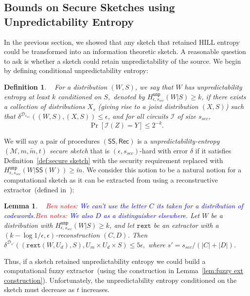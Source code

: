 \documentclass[11pt]{article}
\newcommand{\defref}[1]{\mbox{Definition~\ref{#1}}}
\newcommand{\lemref}[1]{\mbox{Lemma~\ref{#1}}}
\newcommand{\class}[1]{{\ensuremath{\mathsf{#1}}}}
\newcommand{\sketch}{\ensuremath{\class{SS}}\xspace}
\newcommand{\rec}{\ensuremath{\class{Rec}}\xspace}
\newcommand{\unp}{\ensuremath{\mathtt{unp}}\xspace}
\newcommand{\rext}{\ensuremath{\mathtt{rext}}}
\newtheorem{lemma}[theorem]{Lemma}
\newtheorem{definition}[theorem]{Definition}
\newcommand{\authnote}[2]{{\textcolor{red}{\textsf{#1 notes: }\textcolor{blue}{ #2}}\marginpar{\textcolor{red}{\textbf{!!!!!}}}}}
\newcommand{\authnote}[2]{}
\newcommand{\bnote}[1]{{\authnote{Ben}{#1}}}
\begin{document}
\subsection{Bounds on Secure Sketches using Unpredictability Entropy}
\label{sec:imp unp sketch}
In the previous section, we showed that any sketch that retained HILL entropy could be transformed into an information theoretic sketch.  A reasonable question to ask is whether a sketch could retain unpredictability of the source.  We begin by defining conditional unpredictability entropy:

\begin{definition}~\cite[Definition 7]{DBLP:conf/eurocrypt/HsiaoLR07}
\label{def:unp entropy}
For a distribution $(W, S)$, we say that $W$ has \emph{unpredictability entropy} at least $k$ conditioned on $S,$ denoted by $H^{\unp}_{\epsilon, s_{sec}} (W|S) \geq k$, if there exists a collection of distributions $X_s$ (giving rise to a joint distribution $(X, S)$) such that $\delta^{\mathcal{D}_{s_{sec}}}((W, S),(X, S))\leq \epsilon$, and for all circuits $\mathcal{I}$ of size $s_{sec}$,
\[
\Pr[\mathcal{I}(Z) = Y ] \leq 2^{-k}
.\]
\end{definition}
We will say a pair of procedures $(\sketch, \rec)$ is a \emph{unpredictability-entropy $(\mathcal{M}, m, \tilde{m}, t)$ secure sketch} that is $(\epsilon, s_{sec})$-hard with error $\delta$ if it satisfies \defref{def:secure sketch} with the security requirement replaced with $H^{\unp}_{\epsilon, s_{sec}}(W| \sketch(W))\geq \tilde{m}$.  
We consider this notion to be a natural notion for a computational sketch as it can be extracted from using a reconstructive extractor~(defined in~\cite{barak-computational}):
\begin{lemma}~\cite[Lemma 6]{DBLP:conf/eurocrypt/HsiaoLR07}
\label{lem:unp extraction} 
\bnote{We can't use the letter $C$ its taken for a distribution of codewords.}\bnote{We also $D$ as a distinguisher elsewhere.}
Let $W$ be a distribution with $H^{\unp}_{\epsilon, s_{sec}}(W|S)\geq k$, and let $\rext$ be an extractor with a $(k-\log 1/\epsilon, \epsilon)$-reconstruction $(C,D)$.  Then $\delta^{\mathcal{D}_{s'}}((\rext(W, U_d), S), U_m\times U_d\times S)\leq 5\epsilon,$ where $s'=s_{sec}/(|C|+|D|)$.
\end{lemma}
Thus, if a sketch retained unpredictability entropy we could build a computational fuzzy extractor~(using the construction in \lemref{lem:fuzzy ext construction}).  
Unfortunately, the unpredictability entropy conditioned on the sketch must decrease as $t$ increases.  
\end{document}
